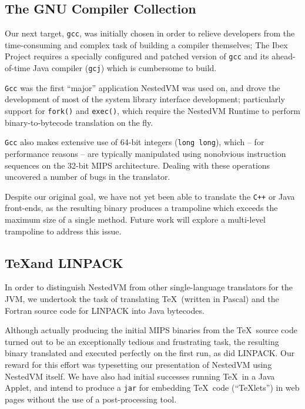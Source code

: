 \documentclass{acmconf}
\begin{document}
\subsection{The GNU Compiler Collection}

Our next target, {\tt gcc}, was initially chosen in order to relieve
developers from the time-consuming and complex task of building a
compiler themselves; The Ibex Project requires a specially configured
and patched version of {\tt gcc} and its ahead-of-time Java compiler
({\tt gcj}) which is cumbersome to build.

{\tt Gcc} was the first ``major'' application NestedVM was used on,
and drove the development of most of the system library interface
development; particularly support for {\tt fork()} and {\tt exec()},
which require the NestedVM Runtime to perform binary-to-bytecode
translation on the fly.

{\tt Gcc} also makes extensive use of 64-bit integers ({\tt long
long}), which -- for performance reasons -- are typically manipulated
using nonobvious instruction sequences on the 32-bit MIPS
architecture.  Dealing with these operations uncovered a number of
bugs in the translator.

Despite our original goal, we have not yet been able to translate the
{\tt C++} or Java front-ends, as the resulting binary produces a
trampoline which exceeds the maximum size of a single method.  Future
work will explore a multi-level trampoline to address this issue.


\subsection{\TeX and LINPACK}

In order to distinguish NestedVM from other single-language
translators for the JVM, we undertook the task of translating \TeX\
(written in Pascal) and the Fortran source code for LINPACK into Java
bytecodes.

Although actually producing the initial MIPS binaries from the \TeX\
source code turned out to be an exceptionally tedious and frustrating
task, the resulting binary translated and executed perfectly on the
first run, as did LINPACK.  Our reward for this effort was typesetting
our presentation of NestedVM using NestedVM itself.  We have also had
initial successes running \TeX\ in a Java Applet, and intend to
produce a {\tt jar} for embedding \TeX\ code (``\TeX lets'') in web
pages without the use of a post-processing tool.
\end{document}
